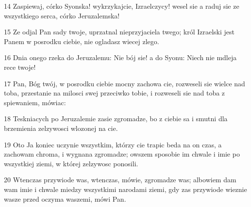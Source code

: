 \par 14 Zaspiewaj, córko Syonska! wykrzykajcie, Izraelczycy! wesel sie a raduj sie ze wszystkiego serca, córko Jeruzalemska!
\par 15 Ze odjal Pan sady twoje, uprzatnal nieprzyjaciela twego; król Izraelski jest Panem w posrodku ciebie, nie ogladasz wiecej zlego.
\par 16 Dnia onego rzeka do Jeruzalemu: Nie bój sie! a do Syonu: Niech nie mdleja rece twoje!
\par 17 Pan, Bóg twój, w posrodku ciebie mocny zachowa cie, rozweseli sie wielce nad toba, przestanie na milosci swej przeciwko tobie, i rozweseli sie nad toba z spiewaniem, mówiac:
\par 18 Teskniacych po Jeruzalemie zasie zgromadze, bo z ciebie sa i smutni dla brzemienia zelzywosci wlozonej na cie.
\par 19 Oto Ja koniec uczynie wszystkim, którzy cie trapic beda na on czas, a zachowam chroma, i wygnana zgromadze; owszem sposobie im chwale i imie po wszystkiej ziemi, w której zelzywosc ponosili.
\par 20 Wtenczas przywiode was, wtenczas, mówie, zgromadze was; albowiem dam wam imie i chwale miedzy wszystkimi narodami ziemi, gdy zas przywiode wieznie wasze przed oczyma waszemi, mówi Pan.


